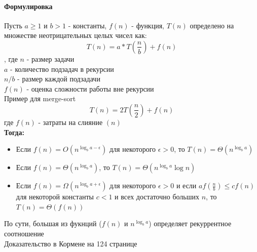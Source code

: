 \documentclass[a4paper,10pt]{article}
\begin{document}
	\paragraph{Формулировка} Пусть  $a \geq 1$ и $b > 1$ - константы, $f(n)$ - функция, $T(n)$ определено на множестве неотрицательных целых чисел как: 
	\[
		T(n) = a*T(\frac{n}{b}) + f(n)
	\], где $n$ - размер задачи \\
	$a$ - количество подзадач в рекурсии \\
	$n/b$ - размер каждой подзадачи \\
	$f(n)$ - оценка сложности работы вне рекурсии \\
	Пример для merge-sort 
	\[	
		T(n) = 2T(\frac{n}{2}) + f(n)
	\]	
	где $f(n)$ - затраты на слияние $(n)$\\
	\textbf{Тогда:}
	\begin{itemize}
		\item Если $f(n) = O(n^{\log_b a - \epsilon})$ для некоторого $\epsilon > 0$, то $T(n) = \Theta(n^{\log_b a})$
		\item Если $f(n) = \Theta(n^{\log_b a})$, то $T(n) = \Theta(n^{\log_b a} \log n)$
		\item Если $f(n) = \Omega(n^{\log_b a + \epsilon})$ для некоторого $\epsilon > 0$ и если $af(\frac{n}{b}) \leq cf(n)$ для некоторой константы $c < 1$ и всех достаточно больших $n$, то $T(n) = \Theta(f(n))$
	\end{itemize}
	По сути, большая из фукнций ($f(n)$ и $n^{\log_b a}$) определяет рекуррентное соотношение \\
	Доказательство в Кормене на 124 странице \\
\end{document}
